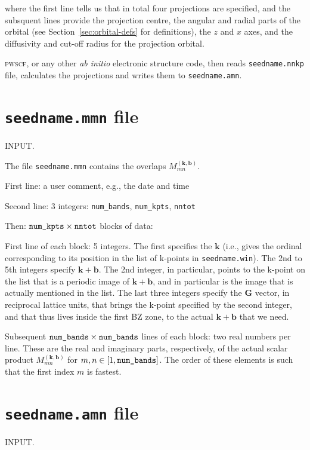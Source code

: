 where the first line tells us that in total four projections are
specified, and the subsquent lines provide the projection centre, the
angular and radial parts of the orbital (see
Section~\ref{sec:orbital-defs} for definitions), the $z$ and $x$ axes,
and the diffusivity and cut-off radius for the projection orbital.

\textsc{pwscf}, or any other \textit{ab initio} electronic structure
code, then reads \verb#seedname.nnkp# file, calculates the projections
and writes them to \verb#seedname.amn#. 


\section{{\tt seedname.mmn} file} 

INPUT. 

The file \verb#seedname.mmn# contains the overlaps
$M_{mn}^{(\mathbf{k,b})}$.

First line: a user comment, e.g., the date and time

Second line: 3 integers: \verb#num_bands#, \verb#num_kpts#,
\verb#nntot#

Then: $\verb#num_kpts#\times\verb#nntot#$ blocks of data:
 
First line of each block: 5 integers. The first specifies the
$\mathbf{k}$ (i.e., gives the ordinal corresponding to its position in
the list  of k-points in \verb#seedname.win#). The 2nd to 5th integers
specify $\mathbf{k+b}$. The  2nd integer, in particular, points to the
k-point on the list that is a  periodic image of $\mathbf{k+b}$, and
in particular is the image that is actually mentioned in the list. The 
last three integers specify the $\mathbf{G}$ vector, in  reciprocal
lattice units, that brings the k-point specified by the second
integer, and that thus lives inside the first BZ zone, to the actual
$\mathbf{k+b}$ that we need.

Subsequent $\verb#num_bands#\times\verb#num_bands#$ lines of each
block: two real numbers per line. These are the real and imaginary
parts, respectively, of the actual scalar product
$M_{mn}^{(\mathbf{k,b})}$ for $m,n \in [1,\verb#num_bands#]$. The
order of these elements is such that the first index $m$ is fastest.


\section{{\tt seedname.amn} file}

INPUT.

